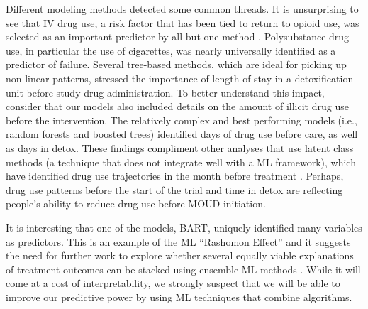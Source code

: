 \documentclass[
  number,
  preprint,
  3p,
  onecolumn]{elsarticle}
\begin{document}
Different modeling methods detected some common threads. It is
unsurprising to see that IV drug use, a risk factor that has been tied
to return to opioid use, was selected as an important predictor by all
but one method \citep{chalana2016}. Polysubstance drug use, in
particular the use of cigarettes, was nearly universally identified as a
predictor of failure. Several tree-based methods, which are ideal for
picking up non-linear patterns, stressed the importance of
length-of-stay in a detoxification unit before study drug
administration. To better understand this impact, consider that our
models also included details on the amount of illicit drug use before
the intervention. The relatively complex and best performing models
(i.e., random forests and boosted trees) identified days of drug use
before care, as well as days in detox. These findings compliment other
analyses that use latent class methods (a technique that does not
integrate well with a ML framework), which have identified drug use
trajectories in the month before treatment \citep{pan2022}. Perhaps,
drug use patterns before the start of the trial and time in detox are
reflecting people's ability to reduce drug use before MOUD initiation.

It is interesting that one of the models, BART, uniquely identified many
variables as predictors. This is an example of the ML ``Rashomon
Effect'' and it suggests the need for further work to explore whether
several equally viable explanations of treatment outcomes can be stacked
using ensemble ML methods
\citep{breiman1996, wolpert1992, paes2023, rudin}. While it will come at
a cost of interpretability, we strongly suspect that we will be able to
improve our predictive power by using ML techniques that combine
algorithms.
\end{document}
